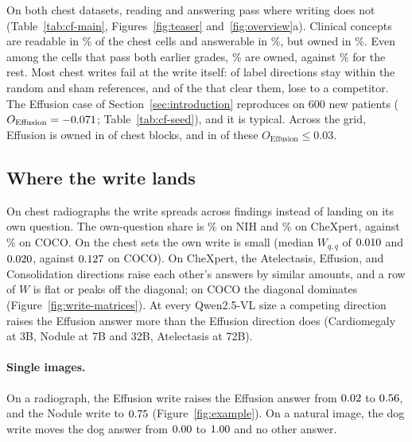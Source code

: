 \documentclass[11pt]{article}
\begin{document}
On both chest datasets, reading and answering pass where writing does not (Table~\ref{tab:cf-main}, Figures~\ref{fig:teaser} and~\ref{fig:overview}a). Clinical concepts are readable in \cfChestReadablePct\% of the \cfChestReadableN{} chest cells and answerable in \cfChestAnswerablePct\%, but owned in \cfChestOwnedPct\%. Even among the cells that pass both earlier grades, \cfReadAnsOwnedPct\% are owned, against \cfRestOwnedPct\% for the rest. Most chest writes fail at the write itself: \cfChestRefBelow{} of \cfChestCellsN{} label directions stay within the random and sham references, and of the \cfChestRefMet{} that clear them, \cfChestRefStrong{} lose to a competitor. \label{sec:seed}The Effusion case of Section~\ref{sec:introduction} reproduces on 600 new patients ($O_{\mathrm{Effusion}}=-0.071$; Table~\ref{tab:cf-seed}), and it is typical. Across the grid, Effusion is owned in \cfEffusionOwnedBlocks{} of \cfChestBlocks{} chest blocks, and in \cfEffusionOwnedSmall{} of these $O_{\mathrm{Effusion}}\leq0.03$.

\subsection{Where the write lands}
\label{sec:deficit}

On chest radiographs the write spreads across findings instead of landing on its own question. The own-question share is \cfOwnShareNih\% on NIH and \cfOwnShareChex\% on CheXpert, against \cfOwnShareCoco\% on COCO. On the chest sets the own write is small (median $W_{q,q}$ of $0.010$ and $0.020$, against $0.127$ on COCO). On CheXpert, the Atelectasis, Effusion, and Consolidation directions raise each other's answers by similar amounts, and a row of $W$ is flat or peaks off the diagonal; on COCO the diagonal dominates (Figure~\ref{fig:write-matrices}). At every Qwen2.5-VL size a competing direction raises the Effusion answer more than the Effusion direction does (Cardiomegaly at 3B, Nodule at 7B and 32B, Atelectasis at 72B).

\paragraph{Single images.} On a radiograph, the Effusion write raises the Effusion answer from $0.02$ to $0.56$, and the Nodule write to $0.75$ (Figure~\ref{fig:example}). On a natural image, the dog write moves the dog answer from $0.00$ to $1.00$ and no other answer.
\end{document}
